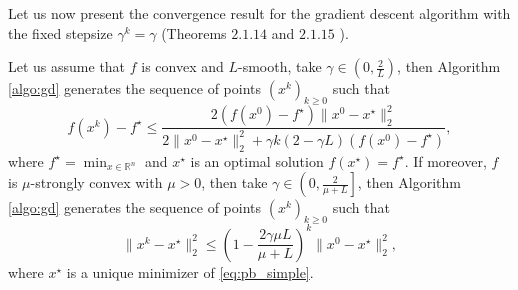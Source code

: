 Let us now present the convergence result for the gradient descent algorithm with the fixed stepsize $\gamma^k = \gamma$ (Theorems $2.1.14$ and $2.1.15$ \cite{nesterov-book}).
\begin{theorem}\label{th:gd}
Let us assume that $f$ is convex and $L$-smooth, take $\gamma\in\left(0,\frac{2}{L}\right)$, then Algorithm \ref{algo:gd} generates the sequence of points $(x^k)_{k\geq0}$ such that 
\begin{equation}
    f(x^k) - f^\star \leq \frac{2(f(x^0)-f^\star)\|x^0-x^\star\|_2^2}{2\|x^0-x^\star\|_2^2 + \gamma k(2-\gamma L)(f(x^0) - f^\star)},
\end{equation}
where $f^\star = \min_{x\in\mathbb{R}^n}$ and $x^\star$ is an optimal solution $f(x^\star) = f^\star$.
If moreover, $f$ is $\mu$-strongly convex with $\mu>0$, then take $\gamma\in\left(0, \frac{2}{\mu + L}\right]$, then Algorithm \ref{algo:gd} generates the sequence of points $(x^k)_{k\geq0}$ such that 
\begin{equation}
\|x^k-x^\star\|_2^2\leq\left(1-\frac{2\gamma\mu L}{\mu + L}\right)^k\|x^0-x^\star\|_2^2,
\end{equation}
where $x^\star$ is a unique minimizer of \eqref{eq:pb_simple}.
\end{theorem}


